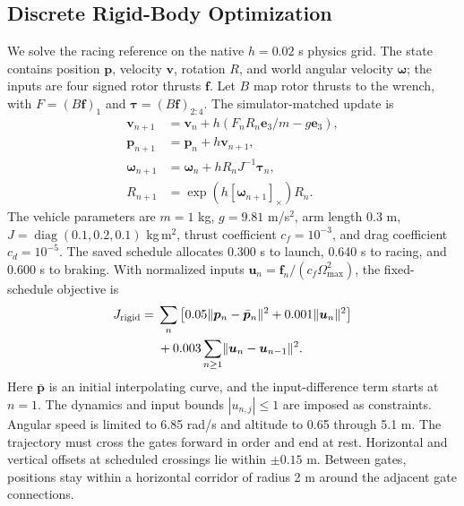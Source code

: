 \documentclass[letterpaper,10pt,conference]{ieeeconf}
\newcommand{\norm}[1]{\lVert#1\rVert}
\begin{document}
\subsection{Discrete Rigid-Body Optimization}
We solve the racing reference on the native $h=0.02$ s physics grid.
The state contains position $\bm p$, velocity $\bm v$, rotation $R$, and world angular velocity $\bm\omega$; the inputs are four signed rotor thrusts $\bm f$.
Let $B$ map rotor thrusts to the wrench, with $F=(B\bm f)_1$ and $\bm\tau=(B\bm f)_{2:4}$.
The simulator-matched update is
\begin{align}
\bm v_{n+1}&=\bm v_n+h(F_nR_n\bm e_3/m-g\bm e_3),\\
\bm p_{n+1}&=\bm p_n+h\bm v_{n+1},\\
\bm\omega_{n+1}&=\bm\omega_n+hR_nJ^{-1}\bm\tau_n,\\
R_{n+1}&=\exp(h[\bm\omega_{n+1}]_\times)R_n.
\end{align}
The vehicle parameters are $m=1$ kg, $g=9.81$ m/s$^2$, arm length 0.3 m, $J=\operatorname{diag}(0.1,0.2,0.1)$ kg\,m$^2$, thrust coefficient $c_f=10^{-3}$, and drag coefficient $c_d=10^{-5}$.
The saved schedule allocates 0.300 s to launch, 0.640 s to racing, and 0.600 s to braking.
With normalized inputs $\bm u_n=\bm f_n/(c_f\Omega_{\max}^2)$, the fixed-schedule objective is
\begin{align}
J_{\rm rigid}={}&\sum_n\left[0.05\norm{\bm p_n-\bar{\bm p}_n}^2
+0.001\norm{\bm u_n}^2\right]\nonumber\\
&+0.003\sum_{n\geq1}\norm{\bm u_n-\bm u_{n-1}}^2.
\end{align}
Here $\bar{\bm p}$ is an initial interpolating curve, and the input-difference term starts at $n=1$.
The dynamics and input bounds $|u_{n,j}|\leq1$ are imposed as constraints.
Angular speed is limited to 6.85 rad/s and altitude to 0.65 through 5.1 m.
The trajectory must cross the gates forward in order and end at rest.
Horizontal and vertical offsets at scheduled crossings lie within $\pm0.15$ m.
Between gates, positions stay within a horizontal corridor of radius 2 m around the adjacent gate connections.
\end{document}

